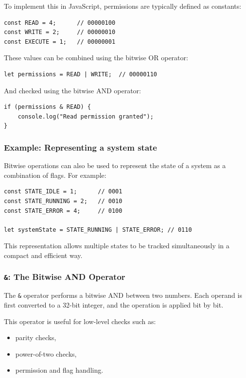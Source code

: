 \documentclass{scrbook}
\begin{document}
To implement this in JavaScript, permissions are typically defined as constants:

\begin{lstlisting}
const READ = 4;      // 00000100
const WRITE = 2;     // 00000010
const EXECUTE = 1;   // 00000001
\end{lstlisting}

These values can be combined using the bitwise OR operator:

\begin{lstlisting}
let permissions = READ | WRITE;  // 00000110
\end{lstlisting}

And checked using the bitwise AND operator:

\begin{lstlisting}
if (permissions & READ) {
    console.log("Read permission granted");
}
\end{lstlisting}

\subsubsection{Example: Representing a system state}

Bitwise operations can also be used to represent the state of a system as a combination of flags. For example:

\begin{lstlisting}
const STATE_IDLE = 1;      // 0001
const STATE_RUNNING = 2;   // 0010
const STATE_ERROR = 4;     // 0100

let systemState = STATE_RUNNING | STATE_ERROR; // 0110
\end{lstlisting}

This representation allows multiple states to be tracked simultaneously in a compact and efficient way.

\subsubsection{\texttt{\&}: The Bitwise AND Operator}

The \texttt{\&} operator performs a bitwise AND between two numbers. Each operand is first converted to a 32-bit integer, and the operation is applied bit by bit.

This operator is useful for low-level checks such as:
\begin{itemize}
    \item parity checks,
    \item power-of-two checks,
    \item permission and flag handling.
\end{itemize}
\end{document}
